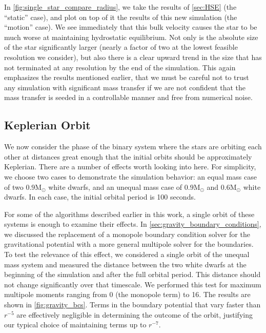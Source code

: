 \documentclass[iop]{../emulateapj}
\newcommand{\msolar}{\mathrm{M}_\odot}
\begin{document}
In \autoref{fig:single_star_compare_radius}, we take the results of 
\autoref{sec:HSE} (the ``static'' case), and plot on top of it the results of this 
new simulation (the ``motion'' case). We see immediately that this bulk velocity
causes the star to be much worse at maintaining hydrostatic equilibrium. Not only 
is the absolute size of the star significantly larger (nearly a factor of two 
at the lowest feasible resolution we consider), but also there is a clear upward 
trend in the size that has not terminated at any resolution by the end of the simulation.
This again emphasizes the results mentioned earlier, that we must be careful not 
to trust any simulation with significant mass transfer if we are not confident that the 
mass transfer is seeded in a controllable manner and free from numerical noise.

\subsection{Keplerian Orbit}\label{sec:kepler}

We now consider the phase of the binary system where the stars are orbiting each other 
at distances great enough that the initial orbits should be approximately Keplerian. 
There are a number of effects worth looking into here. For simplicity, we choose two 
cases to demonstrate the simulation behavior: an equal mass case of two $0.9\msolar$ 
white dwarfs, and an unequal mass case of $0.9\msolar$ and $0.6\msolar$ white dwarfs.
In each case, the initial orbital period is 100 seconds.

For some of the algorithms described earlier in this work, a single orbit of these 
systems is enough to examine their effects. In \autoref{sec:gravity_boundary_conditions},
we discussed the replacement of a monopole boundary condition solver for the gravitational 
potential with a more general multipole solver for the boundaries. To test the relevance 
of this effect, we considered a single orbit of the unequal mass system and measured 
the distance between the two white dwarfs at the beginning of the simulation and after 
the full orbital period. This distance should not change significantly over that timescale.
We performed this test for maximum multipole moments ranging from 0 (the monopole term) to 16.
The results are shown in \autoref{fig:gravity_bcs}. Terms in the boundary potential 
that vary faster than $r^{-5}$ are effectively negligible in determining the outcome of the orbit, 
justifying our typical choice of maintaining terms up to $r^{-7}$.
\end{document}
